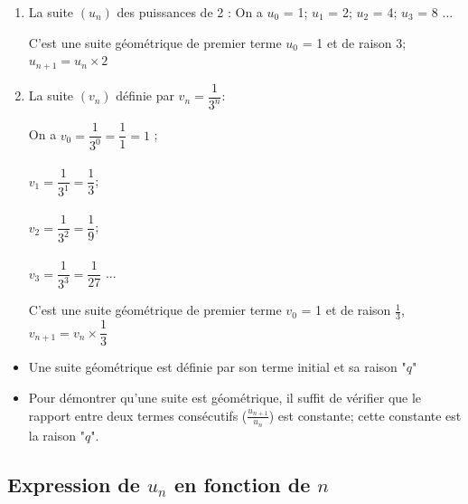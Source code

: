 \documentclass[12pt,a4paper]{article}
\begin{document}
\begin{myex}
	\begin{enumerate}
		\item La suite $(u_n)$ des puissances de 2 :
			On a $u_0$ = 1; $u_1$ = 2; $u_2$ = 4; $u_3$ = 8 ...
		
		C'est une suite géométrique de premier terme $u_0$ = 1 et de raison 3; \\ $u_{n+1} = u_n \times 2 $
		
		\item La suite $(v_n)$ définie par $v_n = \dfrac{1}{3^n}$: 
		
		\begin{multicols}{2}
			On a $v_0 = \dfrac{1}{3^0}  = \dfrac{1}{1} = 1$ ; \\ \\
			$v_1 = \dfrac{1}{3^1} = \dfrac{1}{3}$; \\ \\
			$v_2 = \dfrac{1}{3^2} = \dfrac{1}{9}$; \\ \\
			$v_3 = \dfrac{1}{3^3} = \dfrac{1}{27}$ ...
		\end{multicols}
		
		C'est une suite géométrique de premier terme $v_0$ = 1 et de raison $\frac{1}{3}$,\\ $v_{n+1} = v_n \times \dfrac{1}{3} $
	\end{enumerate}
\end{myex}	

\begin{myrem}
	\begin{itemize}
		\item Une suite géométrique est définie par son terme initial et sa raison "$q$"
		
		\item Pour démontrer qu'une suite est géométrique, il suffit de vérifier que le rapport entre deux termes consécutifs ($\frac{u_{n+1}}{u_n}$) est constante; cette constante est la raison "$q$".
	\end{itemize}
\end{myrem}

\subsection{Expression de $u_n$ en fonction de $n$}
\end{document}

